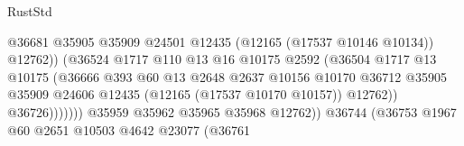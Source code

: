 \begin{lexlean}{RustStd}
\begin{coremodule}
                                                    @36681
                                                    @35905
                                                    @35909
                                                    @24501
                                                    @12435
                                                    (@12165 (@17537 @10146 @10134))
                                                    @12762))
                                                (@36524
                                                  @1717
                                                  @110
                                                  @13
                                                  @16
                                                  @10175
                                                  @2592
                                                  (@36504
                                                    @1717
                                                    @13
                                                    @10175
                                                    (@36666
                                                      @393
                                                      @60
                                                      @13
                                                      @2648
                                                      @2637
                                                      @10156
                                                      @10170
                                                      @36712
                                                      @35905
                                                      @35909
                                                      @24606
                                                      @12435
                                                      (@12165 (@17537 @10170 @10157))
                                                      @12762))
                                                  @36726)))))))
                                    @35959
                                    @35962
                                    @35965
                                    @35968
                                    @12762))
                                @36744
                                (@36753
                                  @1967
                                  @60
                                  @2651
                                  @10503
                                  @4642
                                  @23077
                                  (@36761

\end{coremodule}
\end{lexlean}
